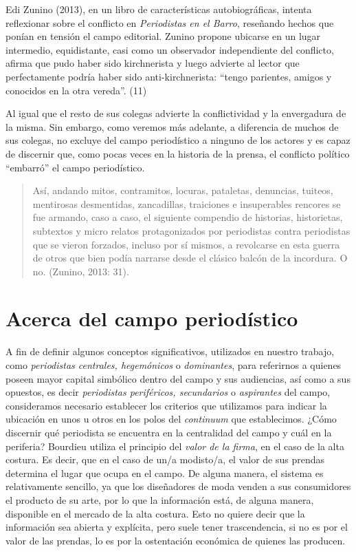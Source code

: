 Edi Zunino (2013), en un libro de características autobiográficas, intenta reflexionar sobre el conflicto en \emph{Periodistas en el Barro}, reseñando hechos que ponían en tensión el campo editorial. Zunino propone ubicarse en un lugar intermedio, equidistante, casi como un observador independiente del conflicto, afirma que pudo haber sido kirchnerista y luego advierte al lector que perfectamente podría haber sido anti-kirchnerista: ``tengo parientes, amigos y conocidos en la otra vereda''. (11)

Al igual que el resto de sus colegas advierte la conflictividad y la envergadura de la misma. Sin embargo, como veremos más adelante, a diferencia de muchos de sus colegas, no excluye del campo periodístico a ninguno de los actores y es capaz de discernir que, como pocas veces en la historia de la prensa, el conflicto político ``embarró'' el campo periodístico.

\begin{quote}
	Así, andando mitos, contramitos, locuras, pataletas, denuncias, tuiteos, mentirosas desmentidas, zancadillas, traiciones e insuperables rencores se fue armando, caso a caso, el siguiente compendio de historias, historietas, subtextos y micro relatos protagonizados por periodistas contra periodistas que se vieron forzados, incluso por sí mismos, a revolcarse en esta guerra de otros que bien podía narrarse desde el clásico balcón de la incordura. O no. (Zunino, 2013: 31).
\end{quote}


\section {Acerca del campo periodístico}

A fin de definir algunos conceptos significativos, utilizados en nuestro trabajo, como \emph{periodistas centrales, hegemónicos} o \emph{dominantes}, para referirnos a quienes poseen mayor capital simbólico dentro del campo y sus audiencias, así como a sus opuestos, es decir \emph{periodistas periféricos, secundarios} o \emph{aspirantes} del campo, consideramos necesario establecer los criterios que utilizamos para indicar la ubicación en unos u otros en los polos del \emph{continuum} que establecimos. ¿Cómo discernir qué periodista se encuentra en la centralidad del campo y cuál en la periferia? Bourdieu utiliza el principio del \emph{valor de la firma}, en el caso de la alta costura. Es decir, que en el caso de un/a modisto/a, el valor de sus prendas determina el lugar que ocupa en el campo. De alguna manera, el sistema es relativamente sencillo, ya que los diseñadores de moda venden a sus consumidores el producto de su arte, por lo que la información está, de alguna manera, disponible en el mercado de la alta costura. Esto no quiere decir que la información sea abierta y explícita, pero suele tener trascendencia, si no es por el valor de las prendas, lo es por la ostentación económica de quienes las producen.

